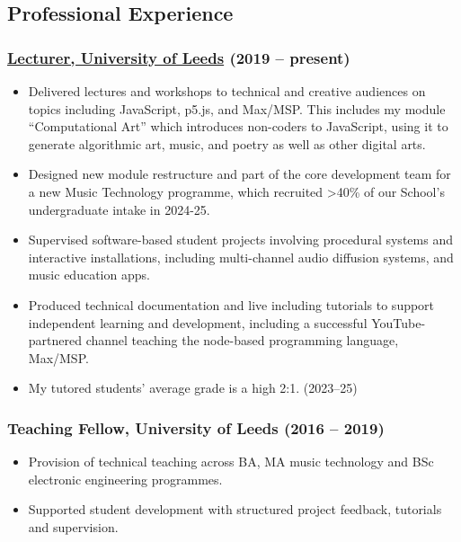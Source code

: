 \documentclass[10pt,a4paper]{article}
\providecommand{\tightlist}{%
  \setlength{\itemsep}{0pt}\setlength{\parskip}{0pt}}
\begin{document}
\subsection{Professional Experience}\label{professional-experience}

\subsubsection{\texorpdfstring{\href{https://ahc.leeds.ac.uk/music/staff/488/dr-oliver-thurley}{Lecturer,
University of Leeds} (2019 --
present)}{Lecturer, University of Leeds (2019 -- present)}}\label{lecturer-university-of-leeds-2019-present}

\begin{itemize}
\tightlist
\item
  Delivered lectures and workshops to technical and creative audiences
  on topics including JavaScript, p5.js, and Max/MSP. This includes my
  module ``Computational Art'' which introduces non-coders to
  JavaScript, using it to generate algorithmic art, music, and poetry as
  well as other digital arts.
\item
  Designed new module restructure and part of the core development team
  for a new Music Technology programme, which recruited \textgreater40\%
  of our School's undergraduate intake in 2024-25.
\item
  Supervised software-based student projects involving procedural
  systems and interactive installations, including multi-channel audio
  diffusion systems, and music education apps.
\item
  Produced technical documentation and live including tutorials to
  support independent learning and development, including a successful
  YouTube-partnered channel teaching the node-based programming
  language, Max/MSP.
\item
  My tutored students' average grade is a high 2:1. (2023--25)
\end{itemize}

\subsubsection{Teaching Fellow, University of Leeds (2016 --
2019)}\label{teaching-fellow-university-of-leeds-2016-2019}

\begin{itemize}
\tightlist
\item
  Provision of technical teaching across BA, MA music technology and BSc
  electronic engineering programmes.
\item
  Supported student development with structured project feedback,
  tutorials and supervision.
\end{itemize}
\end{document}
